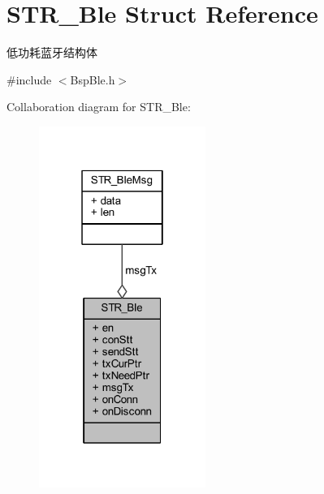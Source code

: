 \hypertarget{struct_s_t_r___ble}{\section{\-S\-T\-R\-\_\-\-Ble \-Struct \-Reference}
\label{struct_s_t_r___ble}
}


低功耗蓝牙结构体  




{\ttfamily \#include $<$\-Bsp\-Ble.\-h$>$}



\-Collaboration diagram for \-S\-T\-R\-\_\-\-Ble\-:\nopagebreak
\begin{figure}[H]
\begin{center}
\leavevmode
\includegraphics[width=154pt]{struct_s_t_r___ble__coll__graph}
\end{center}
\end{figure}
